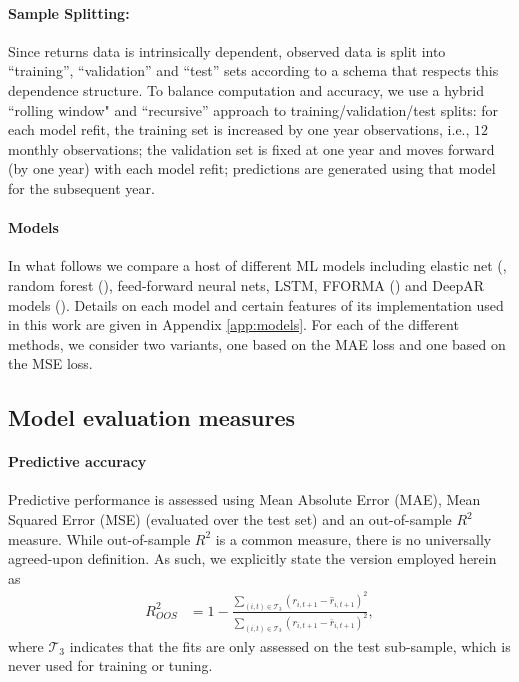 \documentclass{article}
\begin{document}
\paragraph{Sample Splitting:} Since returns data is intrinsically dependent, observed data is split into ``training”, ``validation'' and ``test'' sets according to a schema that respects this dependence structure. To balance computation and accuracy, we use a  hybrid ``rolling window"  and ``recursive'' approach to training/validation/test splits: for each model refit, the training set is increased by one year observations, i.e., $12$ monthly observations; the validation set is fixed at one year and moves forward (by one year) with each model refit; predictions are generated using that model for the subsequent year.


\paragraph{Models} In what follows we compare a host of different ML models including elastic net (\cite{zou_regularization_2005}, random forest (\cite{breiman_random_2001}), feed-forward neural nets, LSTM, FFORMA (\cite{montero-manso_fforma_2020}) and DeepAR models (\cite{salinas_deepar_2019}). Details on each model and certain features of its implementation used in this work are given in Appendix \ref{app:models}. For each of the different methods, we consider two variants, one based on the MAE loss and one based on the MSE loss. 

\subsection{Model evaluation measures}
\paragraph{Predictive accuracy}

Predictive performance is assessed using Mean Absolute Error (MAE), Mean Squared Error (MSE) (evaluated over the test set) and an out-of-sample $R^2$ measure. While  out-of-sample $R^2$ is a common measure, there is no universally agreed-upon definition. As such, we explicitly state the version employed herein as
\begin{align}
R^2_{OOS} &= 1 - \frac{\sum_{(i, t)\in\mathcal{T}_3}(r_{i, t+1} - \widehat{r}_{i, t+1})^2}
{\sum_{(i, t)\in\mathcal{T}_3} \left( r_{i, t+1} - \bar{r}_{i, t+1} \right) ^2},
\end{align}
where $\mathcal{T}_3$ indicates that the fits are only assessed on the test sub-sample, which is never used for training or tuning.
\end{document}
